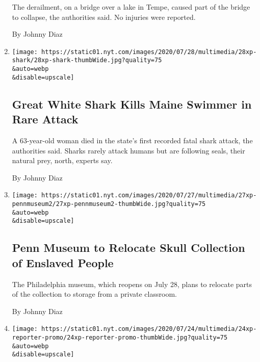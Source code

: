 \begin{enumerate}
  The derailment, on a bridge over a lake in Tempe, caused part of the
  bridge to collapse, the authorities said. No injuries were reported.

  By Johnny Diaz
\item
  \href{/2020/07/28/us/shark-attack-harpswell-maine.html}{}

  \texttt{[image: https://static01.nyt.com/images/2020/07/28/multimedia/28xp-shark/28xp-shark-thumbWide.jpg?quality=75\\\&auto=webp\\\&disable=upscale]}

  \hypertarget{great-white-shark-kills-maine-swimmer-in-rare-attack}{%
  \subsection{Great White Shark Kills Maine Swimmer in Rare
  Attack}\label{great-white-shark-kills-maine-swimmer-in-rare-attack}}

  A 63-year-old woman died in the state's first recorded fatal shark
  attack, the authorities said. Sharks rarely attack humans but are
  following seals, their natural prey, north, experts say.

  By Johnny Diaz
\item
  \href{/2020/07/27/us/Penn-museum-slavery-skulls-Morton-cranial.html}{}

  \texttt{[image: https://static01.nyt.com/images/2020/07/27/multimedia/27xp-pennmuseum2/27xp-pennmuseum2-thumbWide.jpg?quality=75\\\&auto=webp\\\&disable=upscale]}

  \hypertarget{penn-museum-to-relocate-skull-collection-of-enslaved-people}{%
  \subsection{Penn Museum to Relocate Skull Collection of Enslaved
  People}\label{penn-museum-to-relocate-skull-collection-of-enslaved-people}}

  The Philadelphia museum, which reopens on July 28, plans to relocate
  parts of the collection to storage from a private classroom.

  By Johnny Diaz
\item
  \href{/2020/07/25/us/victoria-price-thyroid-cancer.html}{}

  \texttt{[image: https://static01.nyt.com/images/2020/07/24/multimedia/24xp-reporter-promo/24xp-reporter-promo-thumbWide.jpg?quality=75\\\&auto=webp\\\&disable=upscale]}

  \hypertarget{a-viewer-spotted-a-lump-on-her-neck-now-shes-having-a-tumor-removed}{%
}
\end{enumerate}
